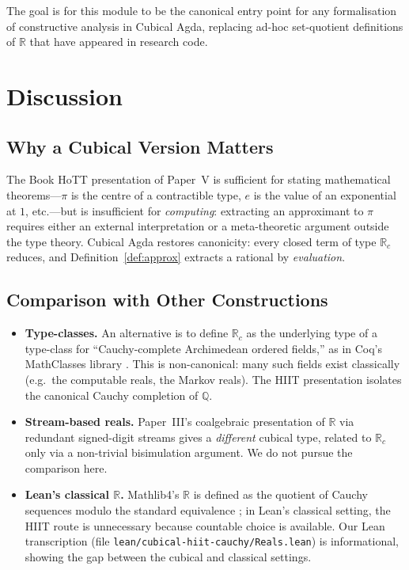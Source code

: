 \documentclass[12pt]{article}
\theoremstyle{definition}
\theoremstyle{remark}
\newcommand{\R}{\mathbb{R}}
\newcommand{\Q}{\mathbb{Q}}
\newcommand{\Rc}{\mathbb{R}_{c}}
\begin{document}
The goal is for this module to be the canonical entry point for any
formalisation of constructive analysis in Cubical Agda, replacing
ad-hoc set-quotient definitions of $\R$ that have appeared in
research code.

\section{Discussion}
\label{sec:discussion}

\subsection{Why a Cubical Version Matters}

The Book HoTT presentation of Paper~V is sufficient for stating
mathematical theorems---$\pi$ is the centre of a contractible type, $e$
is the value of an exponential at $1$, etc.---but is insufficient for
\emph{computing}: extracting an approximant to $\pi$ requires either an
external interpretation or a meta-theoretic argument outside the type
theory. Cubical Agda restores canonicity: every closed term of type
$\Rc$ reduces, and Definition~\ref{def:approx} extracts a rational by
\emph{evaluation}.

\subsection{Comparison with Other Constructions}

\begin{itemize}
\item \textbf{Type-classes.} An alternative is to define $\Rc$ as the
underlying type of a type-class for ``Cauchy-complete Archimedean
ordered fields,'' as in Coq's MathClasses library
\cite{MathClasses}. This is non-canonical: many such fields exist
classically (e.g.\ the computable reals, the Markov reals).
The HIIT presentation isolates the canonical Cauchy completion of $\Q$.
\item \textbf{Stream-based reals.} Paper~III's coalgebraic presentation
of $\R$ via redundant signed-digit streams gives a \emph{different}
cubical type, related to $\Rc$ only via a non-trivial bisimulation
argument. We do not pursue the comparison here.
\item \textbf{Lean's classical $\R$.} Mathlib4's $\R$ is defined as the
quotient of Cauchy sequences modulo the standard equivalence
\cite{LeanReal}; in Lean's classical setting, the HIIT route is
unnecessary because countable choice is available. Our Lean transcription
(file \verb|lean/cubical-hiit-cauchy/Reals.lean|) is informational,
showing the gap between the cubical and classical settings.
\end{itemize}
\end{document}
